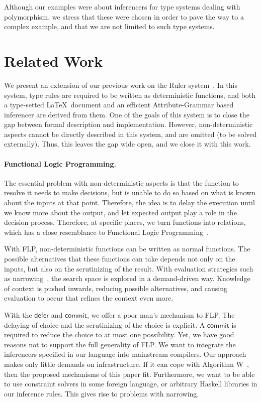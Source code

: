 \documentclass[preprint,natbib]{sigplanconf}
\newcommand\Defer{\mathsf{defer}}
\newcommand\Commit{\mathsf{commit}}
\begin{document}
    Although our examples were about inferencers for type systems dealing with polymorphism, we stress that these were chosen
    in order to pave the way to a complex example, and that we are not limited to such type systems.


\section{Related Work}
\label{sect:related-work}

    We present an extension of our previous work on the Ruler system~\cite{DBLP:conf/flops/DijkstraS06}.
    In this system, type rules are required to be written as deterministic functions, and both a type-setted \LaTeX~document
    and an efficient Attribute-Grammar based inferencer are derived from them. One of the goals of this
    system is to close the gap between formal description and implementation. However, non-deterministic aspects
    cannot be directly described in this system, and are omitted (to be solved externally). Thus, this leaves the gap
    wide open, and we close it with this work.

    \paragraph{Functional Logic Programming.}
    The essential problem with non-deterministic aspects is that the function to resolve it needs to make decisions,
    but is unable to do so based on what is known about the inputs at that point. Therefore, the idea is to delay
    the execution until we know more about the output, and let expected output play a role in the decision process.
    Therefore, at specific places, we turn functions into relations, which has a close resemblance to
    Functional Logic Programming~\cite{DBLP:journals/jlp/Hanus94}.

    With FLP, non-deterministic functions can be written as normal functions. The possible
    alternatives that these functions can take depends not only on the inputs, but also on the scrutinizing of the
    result. With evaluation strategies such as narrowing~\cite{DBLP:conf/alp/Antoy97}, the search space is explored
    in a demand-driven way. Knowledge of context is pushed inwards, reducing possible alternatives, and causing
    evaluation to occur that refines the context even more.

    With the $\Defer$ and $\Commit$, we offer a poor man's mechanism to FLP. The delaying of choice and the
    scrutinizing of the choice is explicit. A $\Commit$ is required to reduce the choice to at most one
    possibility. Yet, we have good reasons not to support the full generality of FLP. We want to integrate the
    inferencers specified in our language into mainstream compilers. Our approach makes only little demands on
    infrastructure. If it can cope with Algorithm W~\cite{DBLP:journals/jcss/Milner78}, then the proposed mechanisms
    of this paper fit. Furthermore, we want to be able to use constraint solvers in some foreign language, or arbitrary
    Haskell libraries in our inference rules. This gives rise to problems with narrowing.
\end{document}
